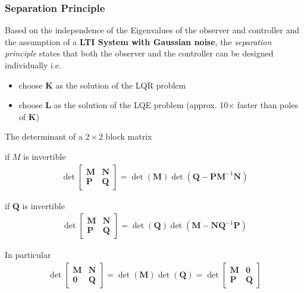 \subsubsection{Separation Principle}

Based on the independence of the Eigenvalues of the observer and controller and the assumption of a \textbf{LTI System with Gaussian noise}, the \textit{separation principle} states that
both the observer and the controller can be designed individually i.e.\
\begin{itemize}
    \item choose $\mathbf{K}$ as the solution of the LQR problem
    \item choose $\mathbf{L}$ as the solution of the LQE problem \newline(approx. 10$\times$ faster than poles of $\mathbf{K}$)
\end{itemize}

\newpar{}

The determinant of a $2\times2$ block matrix

if $M$ is invertible
\begin{align*}
    \det\begin{bmatrix}
            \mathbf{M} & \mathbf{N} \\
            \mathbf{P} & \mathbf{Q}
        \end{bmatrix}
    = \det(\mathbf{M})\det(\mathbf{Q}-\mathbf{PM}^{-1}\mathbf{N})
\end{align*}

if $\mathbf{Q}$ is invertible
\begin{align*}
    \det\begin{bmatrix}
            \mathbf{M} & \mathbf{N} \\
            \mathbf{P} & \mathbf{Q}
        \end{bmatrix}
    = \det(\mathbf{Q})\det(\mathbf{M}-\mathbf{NQ}^{-1}\mathbf{P})
\end{align*}

In particular
\begin{align*}
    \det\begin{bmatrix}
            \mathbf{M} & \mathbf{N} \\
            \mathbf{0} & \mathbf{Q}
        \end{bmatrix}
    = \det(\mathbf{M})\det(\mathbf{Q}) =
    \det\begin{bmatrix}
            \mathbf{M} & \mathbf{0} \\
            \mathbf{P} & \mathbf{Q}
        \end{bmatrix}
\end{align*}

